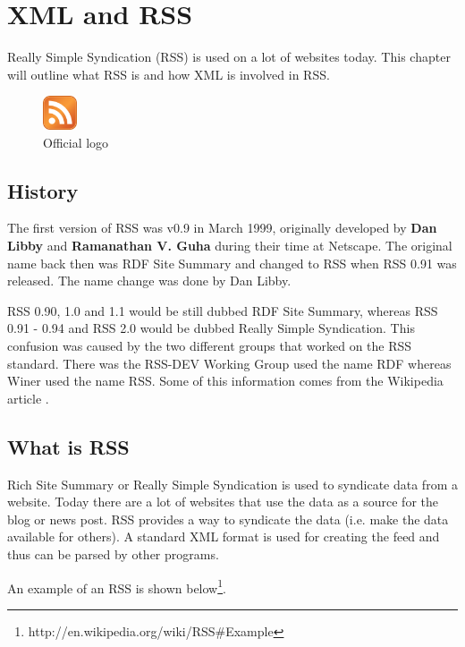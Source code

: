 \chapter{XML and RSS}
\label{chap:XML and RSS}
Really Simple Syndication (RSS) is used on a lot of websites today. This chapter will outline what RSS is and how XML is involved in RSS.

\begin{figure}[ht]
\begin{center}
\includegraphics[width=1cm]{Chapters/01_rss_icon.png}
\caption{Official logo\footnotemark}
\end{center}
\end{figure}


\section{History}
The first version of RSS was v0.9 in March 1999, originally developed by \textbf{Dan Libby} and \textbf{Ramanathan V. Guha} during their time at Netscape. The original name back then was RDF Site Summary and changed to RSS when RSS 0.91 was released. The name change was done by Dan Libby.

RSS 0.90, 1.0 and 1.1 would be still dubbed RDF Site Summary, whereas RSS 0.91 - 0.94 and RSS 2.0 would be dubbed Really Simple Syndication. This confusion was caused by the two different groups that worked on the RSS standard. There was the RSS-DEV Working Group used the name RDF whereas Winer used the name RSS. Some of this information comes from the Wikipedia article \cite{rss-wiki}.

\section{What is RSS}
\label{sec:what-is-rss}
Rich Site Summary or Really Simple Syndication is used to syndicate data from a website. Today there are a lot of websites that use the data as a source for the blog or news post. RSS provides a way to syndicate the data (i.e. make the data available for others). A standard XML format is used for creating the feed and thus can be parsed by other programs\cite{web-content-syndication}.

An example of an RSS is shown below\footnote{http://en.wikipedia.org/wiki/RSS\#Example}.

